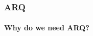 \begin{frame}		
	
	\frametitle{ARQ}
	\framesubtitle{Why do we need ARQ?}
	
	\begin{figure}[H]
	\end{figure}
	
	
\end{frame}